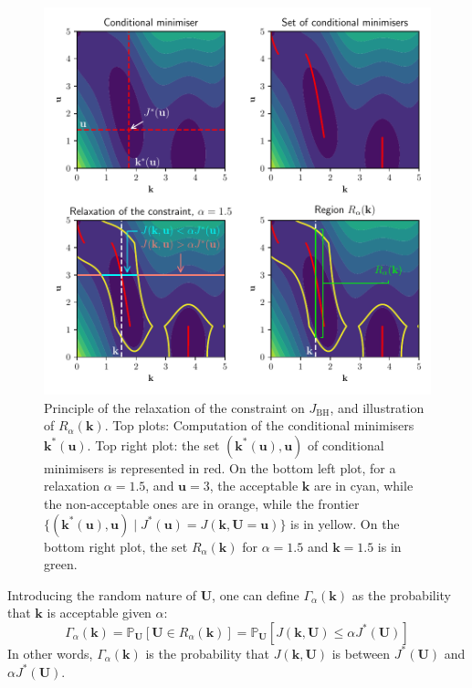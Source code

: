 \documentclass[preprint, review, 1p]{elsarticle}
\newcommand{\Prob}{\mathbb{P}}
\newcommand{\JBH}{J_{\mathrm{BH}}}
\newlength{\onehalfcolumn}
\begin{document}
\begin{figure}[!t]
\centering
\includegraphics[width=\onehalfcolumn]{Figures/FIG03.pdf}
\caption{Principle of the relaxation of the constraint on $\JBH$, and illustration of $R_\alpha(\mathbf{k})$. Top plots: Computation of the conditional minimisers $\mathbf{k}^*(\mathbf{u})$. Top right plot: the set $(\mathbf{k}^*(\mathbf{u}),\mathbf{u})$ of conditional minimisers is represented in red. On the bottom left plot, for a relaxation $\alpha=1.5$, and $\mathbf{u}=3$, the acceptable $\mathbf{k}$ are in cyan, while the non-acceptable ones are in orange, while the frontier $\{(\mathbf{k}^*(\mathbf{u}),\mathbf{u}) \mid J^*(\mathbf{u}) = J(\mathbf{k},\mathbf{U}=\mathbf{u})\}$ is in yellow. On the bottom right plot, the set $R_{\alpha}(\mathbf{k})$ for $\alpha=1.5$ and $\mathbf{k}=1.5$ is in green.}
\label{fig:relax_tuto}
\end{figure}

Introducing the random nature of $\mathbf{U}$, one can define $\Gamma_\alpha(\mathbf{k})$ as the probability that $\mathbf{k}$ is acceptable given $\alpha$:
\begin{equation}
  \label{eq:def_Gamma}
  \Gamma_\alpha(\mathbf{k}) = \Prob_{\mathbf{U}}\left[\mathbf{U} \in R_\alpha(\mathbf{k})\right] = \Prob_{\mathbf{U}}\left[J(\mathbf{k},\mathbf{U}) \leq 
    \alpha J^*(\mathbf{U}) \right]
\end{equation}
In other words, $\Gamma_{\alpha}(\mathbf{k})$ is the probability that $J(\mathbf{k},\mathbf{U})$ is between 
$J^*(\mathbf{U})$ and 
$\alpha J^*(\mathbf{U})$.
\end{document}
